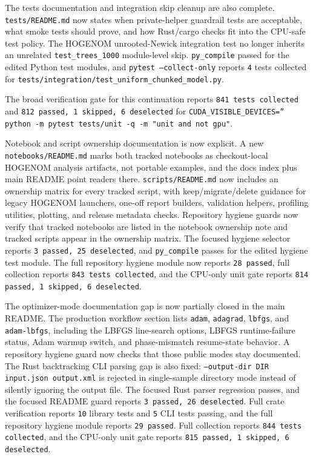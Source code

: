 \documentclass[11pt]{article}
\begin{document}
The tests documentation and integration skip cleanup are also complete.
\texttt{tests/README.md} now states when private-helper guardrail tests are
acceptable, what smoke tests should prove, and how Rust/cargo checks fit into
the CPU-safe test policy.  The HOGENOM unrooted-Newick integration test no
longer inherits an unrelated \texttt{test\_trees\_1000} module-level skip.
\texttt{py\_compile} passed for the edited Python test modules, and
\texttt{pytest --collect-only} reports \texttt{4} tests collected for
\texttt{tests/integration/test\_uniform\_chunked\_model.py}.

The broad verification gate for this continuation reports
\texttt{841 tests collected} and
\texttt{812 passed, 1 skipped, 6 deselected} for
\texttt{CUDA\_VISIBLE\_DEVICES='' python -m pytest tests/unit -q -m "unit and not gpu"}.

Notebook and script ownership documentation is now explicit.  A new
\texttt{notebooks/README.md} marks both tracked notebooks as checkout-local
HOGENOM analysis artifacts, not portable examples, and the docs index plus main
README point readers there.  \texttt{scripts/README.md} now includes an
ownership matrix for every tracked script, with keep/migrate/delete guidance for
legacy HOGENOM launchers, one-off report builders, validation helpers,
profiling utilities, plotting, and release metadata checks.  Repository hygiene
guards now verify that tracked notebooks are listed in the notebook ownership
note and tracked scripts appear in the ownership matrix.  The focused hygiene
selector reports \texttt{3 passed, 25 deselected}, and
\texttt{py\_compile} passes for the edited hygiene test module.  The full
repository hygiene module now reports \texttt{28 passed}, full collection
reports \texttt{843 tests collected}, and the CPU-only unit gate reports
\texttt{814 passed, 1 skipped, 6 deselected}.

The optimizer-mode documentation gap is now partially closed in the main
README.  The production workflow section lists \texttt{adam},
\texttt{adagrad}, \texttt{lbfgs}, and \texttt{adam-lbfgs}, including the LBFGS
line-search options, LBFGS runtime-failure status, Adam warmup switch, and
phase-mismatch resume-state behavior.  A repository hygiene guard now checks
that those public modes stay documented.  The Rust backtracking CLI parsing gap
is also fixed: \texttt{--output-dir DIR input.json output.xml} is rejected in
single-sample directory mode instead of silently ignoring the output file.  The
focused Rust parser regression passes, and the focused README guard reports
\texttt{3 passed, 26 deselected}.  Full crate verification reports
\texttt{10} library tests and \texttt{5} CLI tests passing, and the full
repository hygiene module reports \texttt{29 passed}.  Full collection reports
\texttt{844 tests collected}, and the CPU-only unit gate reports
\texttt{815 passed, 1 skipped, 6 deselected}.
\end{document}
